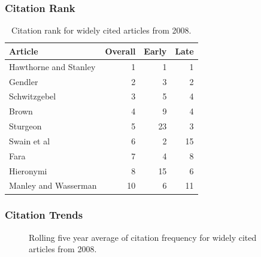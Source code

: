 \documentclass[
  10pt,
  letterpaper,
  DIV=11,
  numbers=noendperiod,
  twoside]{scrartcl}
\begin{document}
\subsubsection*{Citation Rank}\label{sec-rank-2008}

\begin{longtable}[]{@{}lrrr@{}}

\caption{\label{tbl-citation-rank-2008}Citation rank for widely cited
articles from 2008.}

\tabularnewline

\toprule\noalign{}
Article & Overall & Early & Late \\
\midrule\noalign{}
\endhead
\bottomrule\noalign{}
\endlastfoot
Hawthorne and Stanley & 1 & 1 & 1 \\
Gendler & 2 & 3 & 2 \\
Schwitzgebel & 3 & 5 & 4 \\
Brown & 4 & 9 & 4 \\
Sturgeon & 5 & 23 & 3 \\
Swain et al & 6 & 2 & 15 \\
Fara & 7 & 4 & 8 \\
Hieronymi & 8 & 15 & 6 \\
Manley and Wasserman & 10 & 6 & 11 \\

\end{longtable}

\subsubsection*{Citation Trends}\label{sec-trends-2008}

\begin{figure}


\caption{\label{fig-citation-spaghetti-2008}Rolling five year average of
citation frequency for widely cited articles from 2008.}

\end{figure}%
\end{document}
